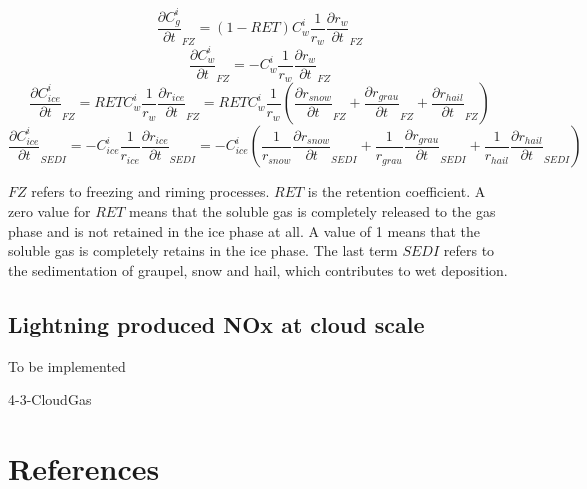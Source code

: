 \begin{equation}
\frac{\partial C_{g}^{i}}{\partial t}_{FZ}=\left ( 1-RET \right )C_{w}^{i}\frac{1}{r_{w}}\frac{\partial r_{w}}{\partial t}_{FZ}
\end{equation}
\begin{equation}
\frac{\partial C_{w}^{i}}{\partial t}_{FZ}=-C_{w}^{i}\frac{1}{r_{w}}\frac{\partial r_{w}}{\partial t}_{FZ}
\end{equation}
\begin{equation}
\frac{\partial C_{ice}^{i}}{\partial t}_{FZ}=RETC_{w}^{i}\frac{1}{r_{w}}\frac{\partial r_{ice}}{\partial t}_{FZ}=RETC_{w}^{i}\frac{1}{r_{w}}\left ( \frac{\partial r_{snow}}{\partial t}_{FZ}+\frac{\partial r_{grau}}{\partial t}_{FZ}+\frac{\partial r_{hail}}{\partial t}_{FZ} \right )
\end{equation}
\begin{equation}
\frac{\partial C_{ice}^{i}}{\partial t}_{SEDI}=-C_{ice}^{i}\frac{1}{r_{ice}}\frac{\partial r_{ice}}{\partial t}_{SEDI}=-C_{ice}^{i}\left ( \frac{1}{r_{snow}}\frac{\partial r_{snow}}{\partial t}_{SEDI}+\frac{1}{r_{grau}}\frac{\partial r_{grau}}{\partial t}_{SEDI}+\frac{1}{r_{hail}}\frac{\partial r_{hail}}{\partial t}_{SEDI} \right )
\end{equation}

$FZ$ refers to freezing and riming processes. $RET$ is the retention coefficient. A zero value for $RET$ means that the soluble gas is completely released to the gas phase and is not retained in the ice phase at all. A value of 1 means that the soluble gas is completely retains in the ice phase. The last term $SEDI$ refers to the sedimentation of graupel, snow and hail, which contributes to wet deposition.

 \subsection{Lightning produced NOx at cloud scale}
To be implemented
%

\begin{btSect}{4-3-CloudGas}
\section{References}
\btPrintCited
\end{btSect}

